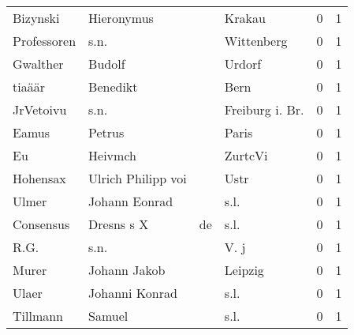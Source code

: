 \documentclass[10pt,a4paper,landscape]{article}
\begin{document}
\begin{longtable}{llllrr}
                 Bizynski &                         Hieronymus &             &                                      Krakau &          0 &         1 \\
              Professoren &                               s.n. &             &                                  Wittenberg &          0 &         1 \\
                 Gwalther &                             Budolf &             &                                      Urdorf &          0 &         1 \\
                   tiaäär &                           Benedikt &             &                                        Bern &          0 &         1 \\
                JrVetoivu &                               s.n. &             &                            Freiburg i. Br.  &          0 &         1 \\
                    Eamus &                             Petrus &             &                                       Paris &          0 &         1 \\
                       Eu &                            Heivmch &             &                                     ZurtcVi &          0 &         1 \\
                 Hohensax &                 Ulrich Philipp voi &             &                                        Ustr &          0 &         1 \\
                    Ulmer &                      Johann Eonrad &             &                                        s.l. &          0 &         1 \\
                Consensus &                         Dresns s X &          de &                                        s.l. &          0 &         1 \\
                     R.G. &                               s.n. &             &                                        V. j &          0 &         1 \\
                    Murer &                       Johann Jakob &             &                                     Leipzig &          0 &         1 \\
                    Ulaer &                     Johanni Konrad &             &                                        s.l. &          0 &         1 \\
                 Tillmann &                             Samuel &             &                                        s.l. &          0 &         1 \\

\end{longtable}
\end{document}
